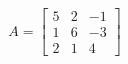\documentclass[preview]{standalone}
\begin{document}
\begin{align*}
A = \begin{bmatrix}5 & 2 & -1 \\1 & 6 & -3 \\2 & 1 & 4\end{bmatrix}
\end{align*}
\end{document}
